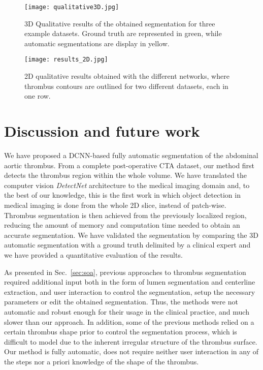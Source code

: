 \documentclass[preprint,authoryear,12pt]{elsarticle}
\begin{document}
\begin{figure}[htb]
\centering
\texttt{[image: qualitative3D.jpg]}
\caption{\label{fig:qua_res}3D Qualitative results of the obtained segmentation for three example datasets. Ground truth are represented in green, while automatic segmentations are display in yellow.}
\end{figure}

\begin{figure}[htb]
\centering
\texttt{[image: results\_2D.jpg]}
\caption{\label{fig:res2D}2D qualitative results obtained with the different networks, where thrombus contours are outlined for two different datasets, each in one row.}
\end{figure}


\section{Discussion and future work}
\label{sec:disc}
We have proposed a DCNN-based fully automatic segmentation of the abdominal aortic thrombus. From a complete post-operative CTA dataset, our method first detects the thrombus region within the whole volume. We have translated the computer vision \textit{DetectNet} architecture to the medical imaging domain and, to the best of our knowledge, this is the first work in which object detection in medical imaging is done from the whole 2D slice, instead of patch-wise. Thrombus segmentation is then achieved from the previously localized region, reducing the amount of memory and computation time needed to obtain an accurate segmentation. We have validated the segmentation by comparing the 3D automatic segmentation with a ground truth delimited by a clinical expert and we have provided a quantitative evaluation of the results. 

As presented in Sec.~\ref{sec:soa}, previous approaches to thrombus segmentation required additional input both in the form of lumen segmentation and centerline extraction, and user interaction to control the segmentation, setup the necessary parameters or edit the obtained segmentation. Thus, the methods were not automatic and robust enough for their usage in the clinical practice, and much slower than our approach. In addition, some of the previous methods relied on a certain thrombus shape prior to control the segmentation process, which is difficult to model due to the inherent irregular structure of the thrombus surface. Our method is fully automatic, does not require neither user interaction in any of the steps nor a priori knowledge of the shape of the thrombus. 
\end{document}

